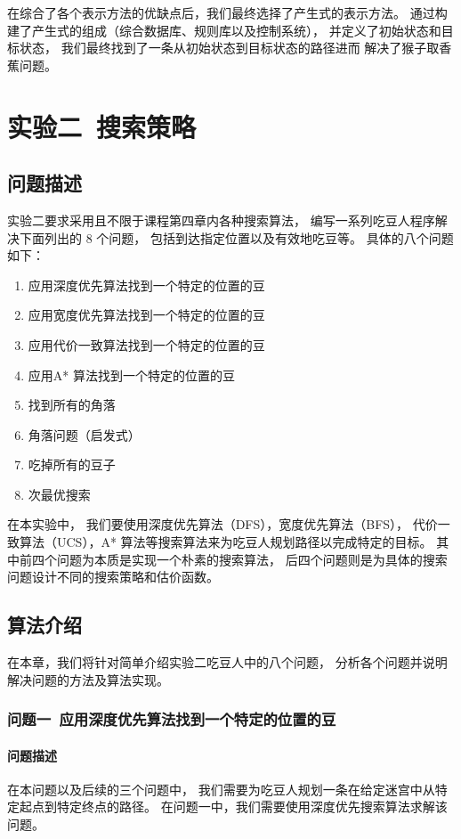 \documentclass[12pt,onecolumn]{report}
\theoremstyle{plain}
\numberwithin{figure}{section}
\begin{document}
在综合了各个表示方法的优缺点后，我们最终选择了产生式的表示方法。
通过构建了产生式的组成（综合数据库、规则库以及控制系统），
并定义了初始状态和目标状态，
我们最终找到了一条从初始状态到目标状态的路径进而
解决了猴子取香蕉问题。

\chapter{实验二~搜索策略}
\section{问题描述}
实验二要求采用且不限于课程第四章内各种搜索算法，
编写一系列吃豆人程序解决下面列出的 8 个问题，
包括到达指定位置以及有效地吃豆等。
具体的八个问题如下：
\begin{enumerate}[fullwidth,itemindent=\parindent,label=问题\arabic*：]
\item 应用深度优先算法找到一个特定的位置的豆
\item 应用宽度优先算法找到一个特定的位置的豆
\item 应用代价一致算法找到一个特定的位置的豆
\item 应用A* 算法找到一个特定的位置的豆
\item 找到所有的角落
\item 角落问题（启发式）
\item 吃掉所有的豆子
\item 次最优搜索
\end{enumerate}

在本实验中，
我们要使用深度优先算法（DFS），宽度优先算法（BFS），
代价一致算法（UCS），A* 算法等搜索算法来为吃豆人规划路径以完成特定的目标。
其中前四个问题为本质是实现一个朴素的搜索算法，
后四个问题则是为具体的搜索问题设计不同的搜索策略和估价函数。

\section{算法介绍}
在本章，我们将针对简单介绍实验二吃豆人中的八个问题，
分析各个问题并说明解决问题的方法及算法实现。

\subsection{问题一~应用深度优先算法找到一个特定的位置的豆}
\subsubsection{问题描述}
在本问题以及后续的三个问题中，
我们需要为吃豆人规划一条在给定迷宫中从特定起点到特定终点的路径。
在问题一中，我们需要使用深度优先搜索算法求解该问题。
\end{document}

